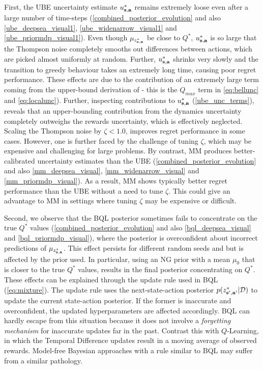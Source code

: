 \documentclass{article}
\begin{document}
First, the UBE uncertainty estimate $u^*_{\mathbf{s}, \mathbf{a}}$ remains extremely loose even after a large number of time-steps (\cref{combined_posterior_evolution} and also \cref{ube_deepsea_visual1}, \cref{ube_widenarrow_visual1} and \cref{ube_priormdp_visual1}). Even though $\mu_{z^*_{\mathbf{s}, \mathbf{a}}}$ be close to $Q^*$, $u^*_{\mathbf{s}, \mathbf{a}}$ is so large that the Thompson noise completely smooths out differences between actions, which are picked almost uniformly at random. Further, $u^*_{\mathbf{s}, \mathbf{a}}$ shrinks very slowly and the transition to greedy behaviour takes an extremely long time, causing poor regret performance. These effects are due to the contribution of an extremely large term coming from the upper-bound derivation of \cite{ube} - this is the $Q_{max}$ term in \cref{eq:bellunc} and \cref{eq:localunc}). Further, inspecting contributions to $u^*_{\mathbf{s}, \mathbf{a}}$ (\cref{ube_unc_terms}), reveals that an upper-bounding contribution from the dynamics uncertainty completely outweighs the rewards uncertainty, which is effectively neglected. Scaling the Thompson noise by $\zeta < 1.0$, improves regret performance in some cases. However, one is further faced by the challenge of tuning $\zeta$, which may be expensive and challenging for large problems. By contrast, MM produces better-calibrated uncertainty estimates than the UBE (\cref{combined_posterior_evolution} and also \cref{mm_deepsea_visual}, \cref{mm_widenarrow_visual} and \cref{mm_priormdp_visual}). As a result, MM shows typically better regret performance than the UBE without a need to tune $\zeta$. This could give an advantage to MM in settings where tuning $\zeta$ may be expensive or difficult.

Second, we observe that the BQL posterior sometimes fails to concentrate on the true $Q^*$ values (\cref{combined_posterior_evolution} and also \cref{bql_deepsea_visual} and \cref{bql_priormdp_visual}), where the posterior is overconfident about incorrect predictions of $\mu_{z^*_{\mathbf{s}, \mathbf{a}}}$. This effect persists for different random seeds and but is affected by the prior used. In particular, using an NG prior with a mean $\mu_0$ that is closer to the true $Q^*$ values, results in the final posterior concentrating on $Q^*$. These effects can be explained through the update rule used in BQL (\cref{eq:mixture}). The update rule uses the next-state-action posterior $p(z^*_{\mathbf{s}', \mathbf{a}'} | \mathcal{D})$ to update the current state-action posterior. If the former is inaccurate and overconfident, the updated hyperparameters are affected accordingly. BQL can hardly escape from this situation because it does not involve a \textit{forgetting mechanism} for inaccurate updates far in the past. Contrast this with $Q$-Learning, in which the Temporal Difference updates result in a moving average of observed rewards. Model-free Bayesian approaches with a rule similar to BQL may suffer from a similar pathology.
\end{document}
